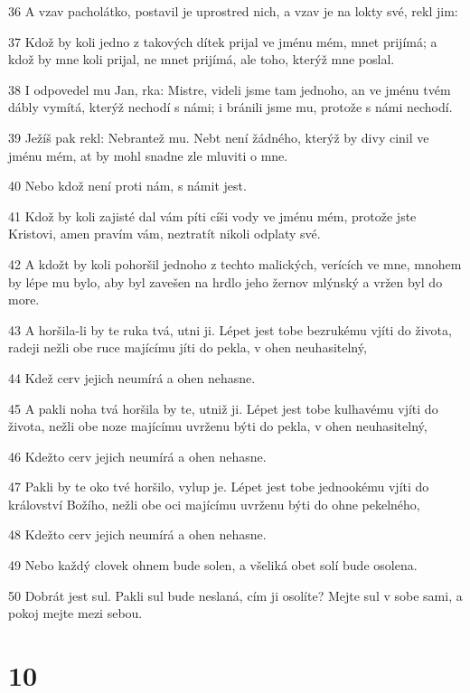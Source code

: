 \par 36 A vzav pacholátko, postavil je uprostred nich, a vzav je na lokty své, rekl jim:
\par 37 Kdož by koli jedno z takových dítek prijal ve jménu mém, mnet prijímá; a kdož by mne koli prijal, ne mnet prijímá, ale toho, kterýž mne poslal.
\par 38 I odpovedel mu Jan, rka: Mistre, videli jsme tam jednoho, an ve jménu tvém dábly vymítá, kterýž nechodí s námi; i bránili jsme mu, protože s námi nechodí.
\par 39 Ježíš pak rekl: Nebrantež mu. Nebt není žádného, kterýž by divy cinil ve jménu mém, at by mohl snadne zle mluviti o mne.
\par 40 Nebo kdož není proti nám, s námit jest.
\par 41 Kdož by koli zajisté dal vám píti cíši vody ve jménu mém, protože jste Kristovi, amen pravím vám, neztratít nikoli odplaty své.
\par 42 A kdožt by koli pohoršil jednoho z techto malických, verících ve mne, mnohem by lépe mu bylo, aby byl zavešen na hrdlo jeho žernov mlýnský a vržen byl do more.
\par 43 A horšila-li by te ruka tvá, utni ji. Lépet jest tobe bezrukému vjíti do života, radeji nežli obe ruce majícímu jíti do pekla, v ohen neuhasitelný,
\par 44 Kdež cerv jejich neumírá a ohen nehasne.
\par 45 A pakli noha tvá horšila by te, utniž ji. Lépet jest tobe kulhavému vjíti do života, nežli obe noze majícímu uvrženu býti do pekla, v ohen neuhasitelný,
\par 46 Kdežto cerv jejich neumírá a ohen nehasne.
\par 47 Pakli by te oko tvé horšilo, vylup je. Lépet jest tobe jednookému vjíti do království Božího, nežli obe oci majícímu uvrženu býti do ohne pekelného,
\par 48 Kdežto cerv jejich neumírá a ohen nehasne.
\par 49 Nebo každý clovek ohnem bude solen, a všeliká obet solí bude osolena.
\par 50 Dobrát jest sul. Pakli sul bude neslaná, cím ji osolíte? Mejte sul v sobe sami, a pokoj mejte mezi sebou.

\chapter{10}

